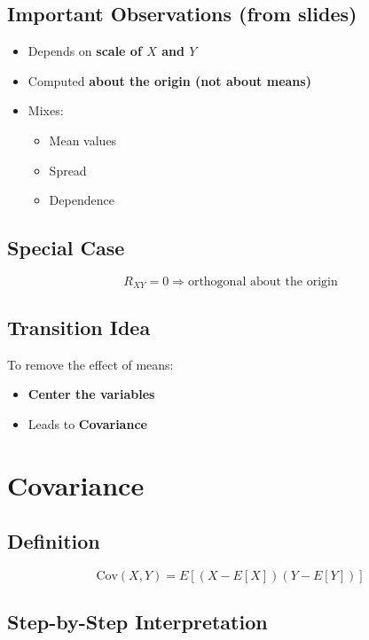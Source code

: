 \documentclass[12pt]{article}
\begin{document}
\subsection*{Important Observations (from slides)}

\begin{itemize}
    \item Depends on \textbf{scale of $X$ and $Y$}
    \item Computed \textbf{about the origin (not about means)}
    \item Mixes:
    \begin{itemize}
        \item Mean values
        \item Spread
        \item Dependence
    \end{itemize}
\end{itemize}

\subsection*{Special Case}

\[
R_{XY} = 0 \Rightarrow \text{orthogonal about the origin}
\]

\subsection*{Transition Idea}

To remove the effect of means:
\begin{itemize}
    \item \textbf{Center the variables}
    \item Leads to \textbf{Covariance}
\end{itemize}

\section{Covariance}

\subsection*{Definition}

\[
\text{Cov}(X,Y) = E[(X - E[X])(Y - E[Y])]
\]

\subsection*{Step-by-Step Interpretation}
\end{document}
